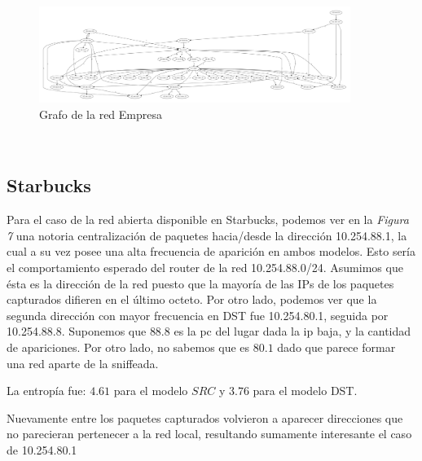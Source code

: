 \begin{figure}[H]
	\center
	\includegraphics[width=0.9\textwidth]{resultados/empresa/conectividad.pdf}
	\caption{Grafo de la red Empresa}
\end{figure}

~

\subsection{Starbucks}

Para el caso de la red abierta disponible en Starbucks, podemos ver en la 
\emph{Figura 7} una notoria centralizaci\'on de paquetes hacia/desde la direcci\'on
10.254.88.1, la cual a su vez posee una alta frecuencia de aparici\'on en ambos
modelos. Esto ser\'ia el comportamiento esperado del router de la red
10.254.88.0/24. Asumimos que \'esta es la direcci\'on de la red puesto que 
la mayor\'ia de las IPs de los paquetes capturados difieren en el \'ultimo octeto.
Por otro lado, podemos ver que la segunda direcci\'on con mayor frecuencia en DST
fue 10.254.80.1, seguida por 10.254.88.8. Suponemos que $88.8$ es la pc del lugar
dada la ip baja, y la cantidad de apariciones. Por otro lado, no sabemos que es
$80.1$ dado que parece formar una red aparte de la sniffeada.

La entrop\'ia fue: $4.61$ para el modelo $SRC$ y $3.76$ para el modelo
DST.

Nuevamente entre los paquetes capturados volvieron a aparecer direcciones que
no parecieran pertenecer a la red local, resultando sumamente interesante el caso
de 10.254.80.1


